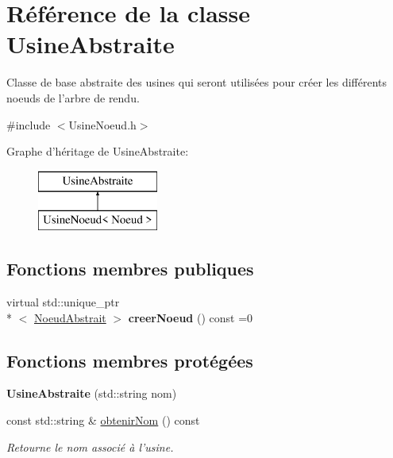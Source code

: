 \hypertarget{class_usine_abstraite}{\section{Référence de la classe Usine\-Abstraite}
\label{class_usine_abstraite}
}


Classe de base abstraite des usines qui seront utilisées pour créer les différents noeuds de l'arbre de rendu.  




{\ttfamily \#include $<$Usine\-Noeud.\-h$>$}

Graphe d'héritage de Usine\-Abstraite\-:\begin{figure}[H]
\begin{center}
\leavevmode
\includegraphics[height=2.000000cm]{class_usine_abstraite}
\end{center}
\end{figure}
\subsection*{Fonctions membres publiques}
\begin{DoxyCompactItemize}
\item 
\hypertarget{class_usine_abstraite_aa7c089bd8474ef50303407688b723ee8}{virtual std\-::unique\-\_\-ptr\\*
$<$ \hyperlink{class_noeud_abstrait}{Noeud\-Abstrait} $>$ {\bfseries creer\-Noeud} () const =0}\label{class_usine_abstraite_aa7c089bd8474ef50303407688b723ee8}

\end{DoxyCompactItemize}
\subsection*{Fonctions membres protégées}
\begin{DoxyCompactItemize}
\item 
\hypertarget{class_usine_abstraite_a6a5dc32968aa9a7ddd052c2b8f694447}{{\bfseries Usine\-Abstraite} (std\-::string nom)}\label{class_usine_abstraite_a6a5dc32968aa9a7ddd052c2b8f694447}

\item 
\hypertarget{group__inf2990_gad39877ea31a37efc3e58708193155c3c}{const std\-::string \& \hyperlink{group__inf2990_gad39877ea31a37efc3e58708193155c3c}{obtenir\-Nom} () const }\label{group__inf2990_gad39877ea31a37efc3e58708193155c3c}

\begin{DoxyCompactList}\small\item\em Retourne le nom associé à l'usine. \end{DoxyCompactList}\end{DoxyCompactItemize}


